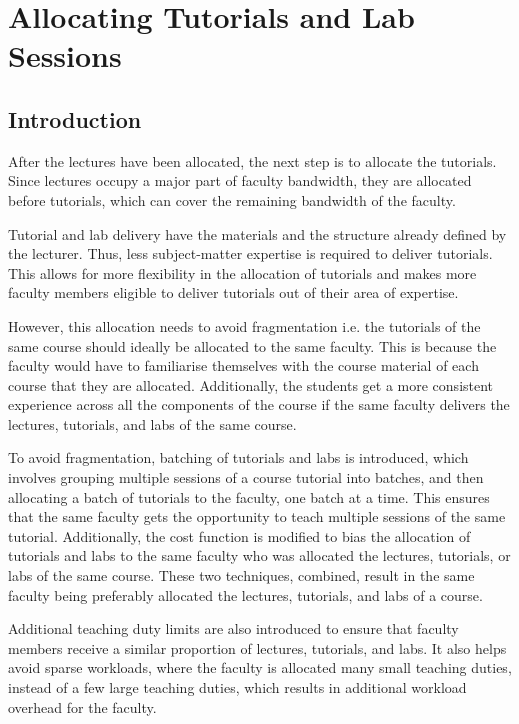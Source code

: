 \chapter{Allocating Tutorials and Lab Sessions}

\section{Introduction}

After the lectures have been allocated, the next step is to allocate the tutorials. Since lectures occupy a major part of faculty bandwidth, they are allocated before tutorials, which can cover the remaining bandwidth of the faculty.

Tutorial and lab delivery have the materials and the structure already defined by the lecturer. Thus, less subject-matter expertise is required to deliver tutorials. This allows for more flexibility in the allocation of tutorials and makes more faculty members eligible to deliver tutorials out of their area of expertise.

However, this allocation needs to avoid fragmentation i.e. the tutorials of the same course should ideally be allocated to the same faculty. This is because the faculty would have to familiarise themselves with the course material of each course that they are allocated. Additionally, the students get a more consistent experience across all the components of the course if the same faculty delivers the lectures, tutorials, and labs of the same course.

To avoid fragmentation, batching of tutorials and labs is introduced, which involves grouping multiple sessions of a course tutorial into batches, and then allocating a batch of tutorials to the faculty, one batch at a time. This ensures that the same faculty gets the opportunity to teach multiple sessions of the same tutorial.  Additionally, the cost function is modified to bias the allocation of tutorials and labs to the same faculty who was allocated the lectures, tutorials, or labs of the same course. These two techniques, combined, result in the same faculty being preferably allocated the lectures, tutorials, and labs of a course.

Additional teaching duty limits are also introduced to ensure that faculty members receive a similar proportion of lectures, tutorials, and labs. It also helps avoid sparse workloads, where the faculty is allocated many small teaching duties, instead of a few large teaching duties, which results in additional workload overhead for the faculty.

